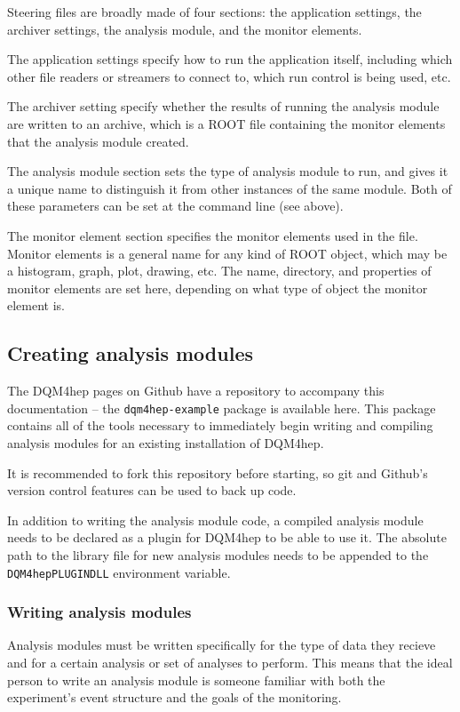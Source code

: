 Steering files are broadly made of four sections: the application settings, the archiver settings, the analysis module, and the monitor elements.

The application settings specify how to run the application itself, including which other file readers or streamers to connect to, which run control is being used, etc. 

The archiver setting specify whether the results of running the analysis module are written to an archive, which is a ROOT file containing the monitor elements that the analysis module created.

The analysis module section sets the type of analysis module to run, and gives it a unique name to distinguish it from other instances of the same module. Both of these parameters can be set at the command line (see above).

The monitor element section specifies the monitor elements used in the file. Monitor elements is a general name for any kind of ROOT object, which may be a histogram, graph, plot, drawing, etc. The name, directory, and properties of monitor elements are set here, depending on what type of object the monitor element is.

\subsection{Creating analysis modules}
The \acrshort{DQM4hep} pages on Github have a repository to accompany this documentation – the \texttt{dqm4hep-example} package is available here. This package contains all of the tools necessary to immediately begin writing and compiling analysis modules for an existing installation of \acrshort{DQM4hep}. 

It is recommended to fork this repository before starting, so git and Github's version control features can be used to back up code.

In addition to writing the analysis module code, a compiled analysis module needs to be declared as a plugin for \acrshort{DQM4hep} to be able to use it. The absolute path to the library file for new analysis modules needs to be appended to the \texttt{DQM4hep\textunderscore PLUGIN\textunderscore DLL} environment variable. 

\subsubsection{Writing analysis modules}
Analysis modules must be written specifically for the type of data they recieve and for a certain analysis or set of analyses to perform. This means that the ideal person to write an analysis module is someone familiar with both the experiment's event structure and the goals of the monitoring.

